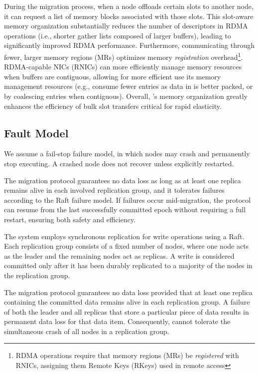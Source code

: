 During the migration process, when a node offloads certain slots to another node, it can request a list of memory blocks associated with those slots.
This slot-aware memory organization substantially reduces the number of descriptors in RDMA operations (i.e., shorter gather lists composed of larger buffers), leading to significantly improved RDMA performance.
Furthermore, communicating through fewer, larger memory regions (MRs) optimizes memory \emph{registration} overhead\footnote{RDMA operations require that memory regions (MRs) be {\em registered} with RNICs, assigning them Remote Keys (RKeys) used in remote access}.
RDMA-capable NICs (RNICs) can more efficiently manage memory resources when buffers are contiguous, allowing for more efficient use its memory management resources (e.g., consume fewer entries as data in \OurImplementation{} is better packed, or by coalescing entries when contiguous).
Overall, \OurImplementation{}'s memory organization greatly enhances the efficiency of bulk slot transfers critical for rapid elasticity.




\subsection{Fault Model}
We assume a fail-stop failure model, 
in which nodes may crash and permanently stop executing. 
A crashed node does not recover unless explicitly restarted.


The migration protocol guarantees no data loss as long as at least one replica remains alive in each involved replication group, and it tolerates failures according to the Raft failure model. If failures occur mid-migration, the protocol can resume from the last successfully committed epoch without requiring a full restart, ensuring both safety and efficiency.

The system employs synchronous replication for write operations using a Raft. 
Each replication group consists of a fixed number of nodes, where one node acts as the leader and the remaining nodes act as replicas. 
A write is considered committed only after it has been durably replicated to a majority of the nodes in the replication group.

The \OurImplementation{} migration protocol guarantees no data loss provided that at least one replica containing the committed data remains alive in each replication group. 
A failure of both the leader and all replicas that store a particular piece of data results in permanent data loss for that data item. 
Consequently, \OurImplementation{} cannot tolerate the simultaneous crash of all nodes in a replication group.

